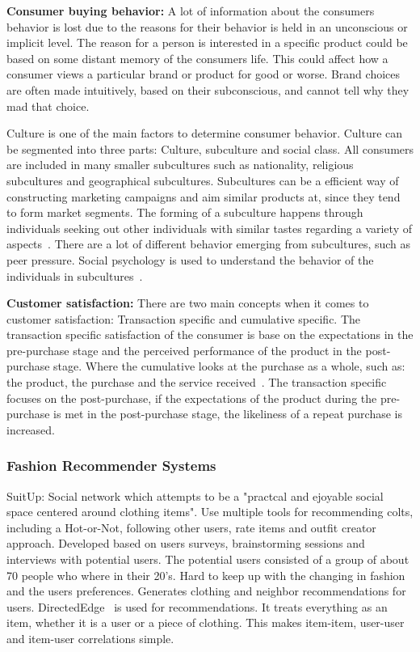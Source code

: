 \textbf{Consumer buying behavior:}
A lot of information about the consumers behavior is lost due to the reasons for their behavior is held in an unconscious or implicit level.
The reason for a person is interested in a specific product could be based on some distant memory of the consumers life.
This could affect how a consumer views a particular brand or product for good or worse.
Brand choices are often made intuitively, based on their subconscious, and cannot tell why they mad that choice.

Culture is one of the main factors to determine consumer behavior.
Culture can be segmented into three parts: Culture, subculture and social class.
All consumers are included in many smaller subcultures such as nationality, religious subcultures and geographical subcultures.
Subcultures can be a efficient way of constructing marketing campaigns and aim similar products at, since they tend to form market segments.
The forming of a subculture happens through individuals seeking out other individuals with similar tastes regarding a variety of aspects~\cite{vignali2009fashion}.
There are a lot of different behavior emerging from subcultures, such as peer pressure.
Social psychology is used to understand the behavior of the individuals in subcultures~\cite{vignali2009fashion}.

\textbf{Customer satisfaction:}
There are two main concepts when it comes to customer satisfaction:
Transaction specific and cumulative specific.
The transaction specific satisfaction of the consumer is base on the expectations in the pre-purchase stage and the perceived performance of the product in the post-purchase stage.
Where the cumulative looks at the purchase as a whole, such as: the product, the purchase and the service received~\cite{kumari2012}.
The transaction specific focuses on the post-purchase, if the expectations of the product during the pre-purchase is met in the post-purchase stage, the likeliness of a repeat purchase is increased.


\subsubsection{Fashion Recommender Systems}

SuitUp:
Social network which attempts to be a "practcal and ejoyable social space
centered around clothing items".  Use multiple tools for recommending colts,
including a Hot-or-Not, following other users, rate items and outfit creator
approach.  Developed based on users surveys, brainstorming sessions and
interviews with potential users.  The potential users consisted of a group of
about 70 people who where in their 20's.  Hard to keep up with the changing in
fashion and the users preferences.  Generates clothing and neighbor
recommendations for users.  DirectedEdge~\cite{direcetedEdge} is used for
recommendations.  It treats everything as an item, whether it is a user or a
piece of clothing.  This makes item-item, user-user and item-user correlations
simple.

